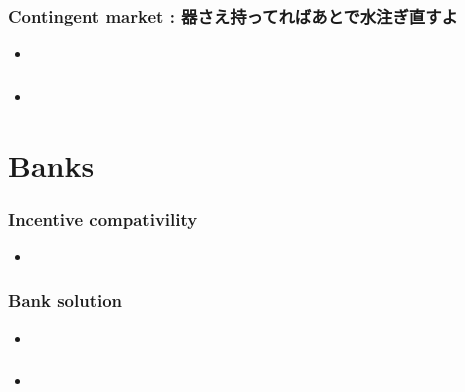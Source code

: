 \documentclass[dvipdfmx, 12pt]{beamer}
\begin{document}
\begin{frame}\frametitle{Contingent market : \small 器さえ持ってればあとで水注ぎ直すよ}
	\begin{itemize}
		\item
	\end{itemize}
\end{frame}
\begin{frame}\frametitle{}
	\begin{itemize}
		\item
	\end{itemize}
\end{frame}


\section{Banks}
\begin{frame}\frametitle{Incentive compativility}
	\begin{itemize}
		\item
	\end{itemize}
\end{frame}
\begin{frame}\frametitle{Bank solution}
	\begin{itemize}
		\item
	\end{itemize}
\end{frame}
\begin{frame}\frametitle{}
	\begin{itemize}
		\item
	\end{itemize}
\end{frame}
\end{document}
